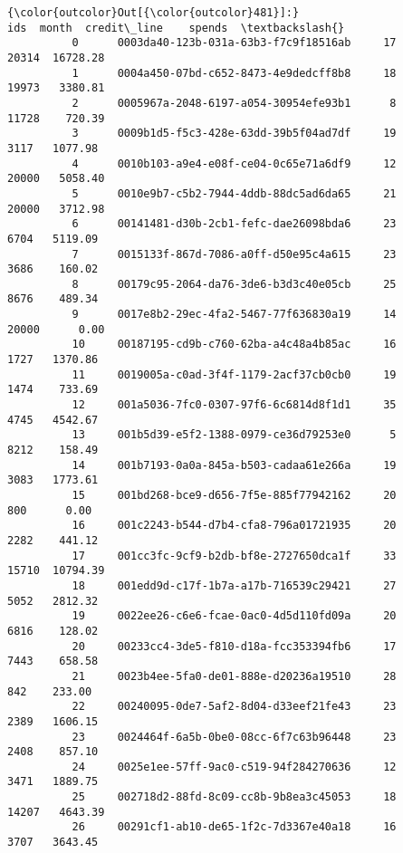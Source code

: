 \documentclass[11pt]{article}
\begin{document}
\begin{Verbatim}[commandchars=\\\{\}]
{\color{outcolor}Out[{\color{outcolor}481}]:}                                         ids  month  credit\_line    spends  \textbackslash{}
          0      0003da40-123b-031a-63b3-f7c9f18516ab     17        20314  16728.28   
          1      0004a450-07bd-c652-8473-4e9dedcff8b8     18        19973   3380.81   
          2      0005967a-2048-6197-a054-30954efe93b1      8        11728    720.39   
          3      0009b1d5-f5c3-428e-63dd-39b5f04ad7df     19         3117   1077.98   
          4      0010b103-a9e4-e08f-ce04-0c65e71a6df9     12        20000   5058.40   
          5      0010e9b7-c5b2-7944-4ddb-88dc5ad6da65     21        20000   3712.98   
          6      00141481-d30b-2cb1-fefc-dae26098bda6     23         6704   5119.09   
          7      0015133f-867d-7086-a0ff-d50e95c4a615     23         3686    160.02   
          8      00179c95-2064-da76-3de6-b3d3c40e05cb     25         8676    489.34   
          9      0017e8b2-29ec-4fa2-5467-77f636830a19     14        20000      0.00   
          10     00187195-cd9b-c760-62ba-a4c48a4b85ac     16         1727   1370.86   
          11     0019005a-c0ad-3f4f-1179-2acf37cb0cb0     19         1474    733.69   
          12     001a5036-7fc0-0307-97f6-6c6814d8f1d1     35         4745   4542.67   
          13     001b5d39-e5f2-1388-0979-ce36d79253e0      5         8212    158.49   
          14     001b7193-0a0a-845a-b503-cadaa61e266a     19         3083   1773.61   
          15     001bd268-bce9-d656-7f5e-885f77942162     20          800      0.00   
          16     001c2243-b544-d7b4-cfa8-796a01721935     20         2282    441.12   
          17     001cc3fc-9cf9-b2db-bf8e-2727650dca1f     33        15710  10794.39   
          18     001edd9d-c17f-1b7a-a17b-716539c29421     27         5052   2812.32   
          19     0022ee26-c6e6-fcae-0ac0-4d5d110fd09a     20         6816    128.02   
          20     00233cc4-3de5-f810-d18a-fcc353394fb6     17         7443    658.58   
          21     0023b4ee-5fa0-de01-888e-d20236a19510     28          842    233.00   
          22     00240095-0de7-5af2-8d04-d33eef21fe43     23         2389   1606.15   
          23     0024464f-6a5b-0be0-08cc-6f7c63b96448     23         2408    857.10   
          24     0025e1ee-57ff-9ac0-c519-94f284270636     12         3471   1889.75   
          25     002718d2-88fd-8c09-cc8b-9b8ea3c45053     18        14207   4643.39   
          26     00291cf1-ab10-de65-1f2c-7d3367e40a18     16         3707   3643.45   

\end{Verbatim}
\end{document}
